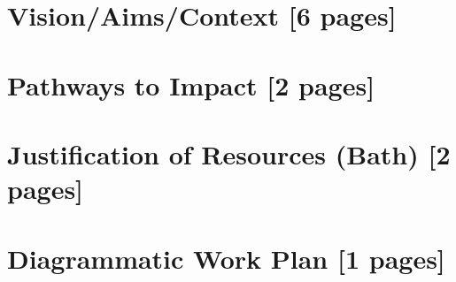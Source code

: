 \documentclass[11pt]{article}
\begin{document}
\section*{Vision/Aims/Context [6 pages]}



\pagebreak
\section*{Pathways to Impact [2 pages]}
%
\pagebreak
\section*{Justification of Resources (Bath) [2 pages]}

\section*{Diagrammatic Work Plan [1 pages]}

%
\end{document}
